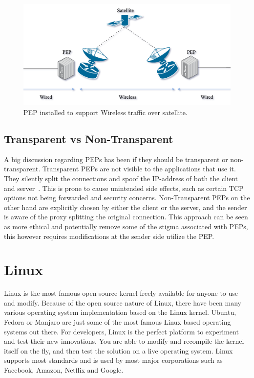 \documentclass[a4paper,english, 11pt]{report}
\begin{document}
\begin{figure}[h] %
	\centering
	\includegraphics[scale=0.50]{../diagrams/drawio/pep_satellite.png}
  	\caption{PEP installed to support Wireless traffic over satellite.}
  	\label{fig:blockage}
\end{figure}

\subsection{Transparent vs Non-Transparent}
A big discussion regarding PEPs has been if they should be transparent or non-transparent. Transparent PEPs are not visible to the applications that use it. They silently split the connections and spoof the IP-address of both the client and server~\cite{pep_dna}. This is prone to cause unintended side effects, such as certain TCP options not being forwarded and security concerns. Non-Transparent PEPs on the other hand are explicitly chosen by either the client or the server, and the sender is aware of the proxy splitting the original connection. This approach can be seen as more ethical and potentially remove some of the stigma associated with PEPs, this however requires modifications at the sender side utilize the PEP.

\section{Linux}

Linux is the most famous open source kernel freely available for anyone to use and modify. Because of the open source nature of Linux, there have been many various operating system implementation based on the Linux kernel. Ubuntu, Fedora or Manjaro are just some of the most famous Linux based operating systems out there. For developers, Linux is the perfect platform to experiment and test their new innovations. You are able to modify and recompile the kernel itself on the fly, and then test the solution on a live operating system. Linux supports most standards and is used by most major corporations such as Facebook, Amazon, Netflix and Google.
\end{document}
